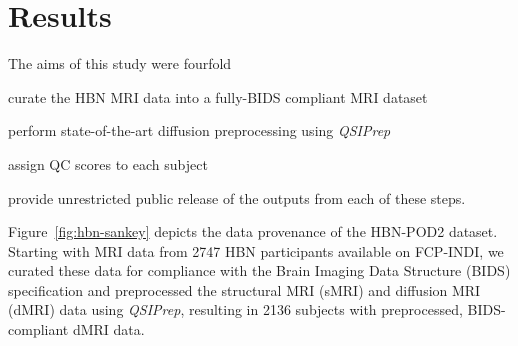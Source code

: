 \documentclass[fleqn,10pt]{wlscirep}
\begin{document}

\section*{Results}

The aims of this study were fourfold
\begin{enumerate*}[%
    label=(\roman*),%
    before=\unskip{: },%
    itemjoin={{, }},%
    itemjoin*={{, and }}]
    \item curate the HBN MRI data into a fully-BIDS compliant MRI dataset
    \item perform state-of-the-art diffusion preprocessing using \emph{QSIPrep}
    \item assign QC scores to each subject
    \item provide unrestricted public release of the outputs from each of these
    steps.
\end{enumerate*}

Figure~\ref{fig:hbn-sankey} depicts the data provenance of the HBN-POD2 dataset.
Starting with MRI data from \num{2747} HBN participants available on FCP-INDI,
we curated these data for compliance with the Brain Imaging Data Structure
(BIDS) specification \cite{gorgolewski2016-lh} and preprocessed the structural
MRI (sMRI) and diffusion MRI (dMRI) data using \emph{QSIPrep}, resulting in
\num{2136} subjects with preprocessed, BIDS-compliant dMRI data.
\end{document}
